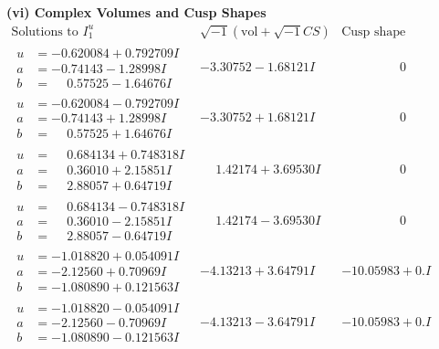 \documentclass[1p]{elsarticle_modified}
\theoremstyle{definition}
\newcommand{\I}{\sqrt{-1}}
\begin{document}
\newpage\flushleft \textbf{(vi) Complex Volumes and Cusp Shapes}
$$\begin{array}{c|c|c}  
\text{Solutions to }I^u_{1}& \I (\text{vol} + \sqrt{-1}CS) & \text{Cusp shape}\\
 \hline 
\begin{aligned}
u &= -0.620084 + 0.792709 I \\
a &= -0.74143 - 1.28998 I \\
b &= \phantom{-}0.57525 - 1.64676 I\end{aligned}
 & -3.30752 - 1.68121 I & \phantom{-0.000000 } 0 \\ \hline\begin{aligned}
u &= -0.620084 - 0.792709 I \\
a &= -0.74143 + 1.28998 I \\
b &= \phantom{-}0.57525 + 1.64676 I\end{aligned}
 & -3.30752 + 1.68121 I & \phantom{-0.000000 } 0 \\ \hline\begin{aligned}
u &= \phantom{-}0.684134 + 0.748318 I \\
a &= \phantom{-}0.36010 + 2.15851 I \\
b &= \phantom{-}2.88057 + 0.64719 I\end{aligned}
 & \phantom{-}1.42174 + 3.69530 I & \phantom{-0.000000 } 0 \\ \hline\begin{aligned}
u &= \phantom{-}0.684134 - 0.748318 I \\
a &= \phantom{-}0.36010 - 2.15851 I \\
b &= \phantom{-}2.88057 - 0.64719 I\end{aligned}
 & \phantom{-}1.42174 - 3.69530 I & \phantom{-0.000000 } 0 \\ \hline\begin{aligned}
u &= -1.018820 + 0.054091 I \\
a &= -2.12560 + 0.70969 I \\
b &= -1.080890 + 0.121563 I\end{aligned}
 & -4.13213 + 3.64791 I & -10.05983 + 0. I\phantom{ +0.000000I} \\ \hline\begin{aligned}
u &= -1.018820 - 0.054091 I \\
a &= -2.12560 - 0.70969 I \\
b &= -1.080890 - 0.121563 I\end{aligned}
 & -4.13213 - 3.64791 I & -10.05983 + 0. I\phantom{ +0.000000I} \\ \hline\begin{aligned}

\end{aligned}
\end{array}$$
\end{document}
